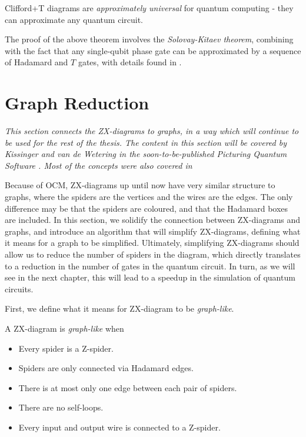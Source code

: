 \begin{theorem}
  Clifford+T diagrams are \textit{approximately universal} for quantum computing - 
  they can approximate any quantum circuit.
\end{theorem}

The proof of the above theorem involves the \textit{Solovay-Kitaev theorem},
combining with the fact that any single-qubit phase gate can be approximated by a sequence of Hadamard and $T$ gates,
with details found in \cite{Nielsen_Chuang_2010}.

\section{Graph Reduction}
\textit{
  This section connects the ZX-diagrams to graphs, in a way which will continue to be used
  for the rest of the thesis.
  The content in this section will be covered by Kissinger and van de Wetering 
  in the soon-to-be-published Picturing Quantum Software \cite{Kissinger2024}.
  Most of the concepts were also covered in \cite{Duncan2020graphtheoretic,Kissinger2020}
}

Because of OCM, ZX-diagrams up until now have very similar structure to graphs,
where the spiders are the vertices and the wires are the edges.
The only difference may be that the spiders are coloured, and that the Hadamard boxes are included.
In this section, we solidify the connection between ZX-diagrams and graphs,
and introduce an algorithm that will simplify ZX-diagrams, defining what it means for a graph to be simplified.
Ultimately, simplifying ZX-diagrams should allow us to reduce the number of spiders in the diagram,
which directly translates to a reduction in the number of gates in the quantum circuit.
In turn, as we will see in the next chapter, this will lead to a speedup in the simulation of quantum circuits.

First, we define what it means for ZX-diagram to be \textit{graph-like}.

\begin{definition}
  A ZX-diagram is \textit{graph-like} when
\begin{itemize}
  \item Every spider is a Z-spider.
  \item Spiders are only connected via Hadamard edges.
  \item There is at most only one edge between each pair of spiders.
  \item There are no self-loops.
  \item Every input and output wire is connected to a Z-spider.
\end{itemize}
\end{definition}

